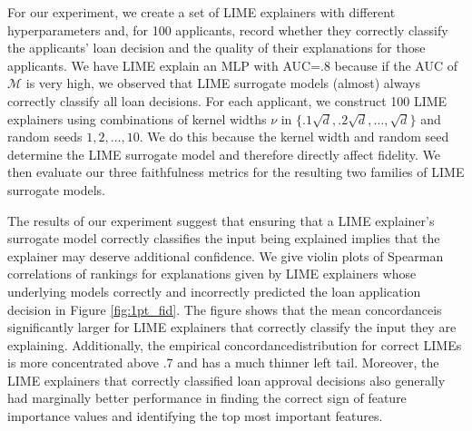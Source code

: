 \documentclass[mnsc,blindrev]{informs3}
\begin{document}
            For our experiment, we create a set of LIME explainers with different hyperparameters and, for 100 applicants, record whether they correctly classify the applicants' loan decision and the quality of their explanations for those applicants. We have LIME explain an MLP with AUC=.8 because if the AUC of $\mathcal{M}$ is very high, we observed that LIME surrogate models (almost) always correctly classify all loan decisions. For each applicant, we construct 100 LIME explainers using combinations of kernel widths $\nu$ in $\{.1\sqrt{d},.2\sqrt{d},\ldots,\sqrt{d}\}$ and random seeds $1,2,\ldots,10$. We do this because the kernel width and random seed determine the LIME surrogate model and therefore directly affect fidelity. We then evaluate our three faithfulness metrics for the resulting two families of LIME surrogate models. %
                    
        
            The results of our experiment suggest that ensuring that a LIME explainer's surrogate model correctly classifies the input being explained implies that the explainer may deserve additional confidence. We give violin plots of Spearman correlations of rankings for explanations given by LIME explainers whose underlying models correctly and incorrectly predicted the loan application decision in Figure \ref{fig:1pt_fid}. The figure shows that the mean concordanceis significantly larger for LIME explainers that correctly classify the input they are explaining. Additionally, the empirical concordancedistribution for correct LIMEs is more concentrated above .7 and has a much thinner left tail. Moreover, the LIME explainers that correctly classified loan approval decisions also generally had marginally better performance in finding the correct sign of feature importance values and identifying the top most important features. 
                    
        
\end{document}
